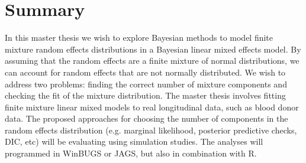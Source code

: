 \chapter{Summary}
\label{ch:summary}


In this master thesis we wish to explore Bayesian methods to model finite mixture random effects distributions in a Bayesian linear mixed effects model. By assuming that the random effects are a finite mixture of normal distributions, we can account for random effects that are not normally distributed. We wish to address two problems: finding the correct number of mixture components and checking the fit of the mixture distribution. The master thesis involves fitting finite mixture linear mixed models to real longitudinal data, such as blood donor data. The proposed approaches for choosing the number of components in the random effects distribution (e.g. marginal likelihood, posterior predictive checks, DIC, etc) will be evaluating using simulation studies. The analyses will programmed in WinBUGS or JAGS, but also in combination with R.